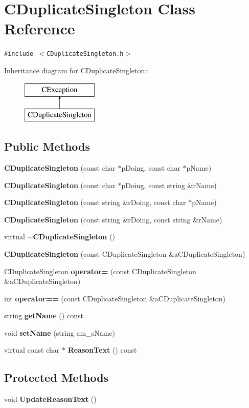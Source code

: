 \section{CDuplicate\-Singleton  Class Reference}
\label{classCDuplicateSingleton}
{\tt \#include $<$CDuplicate\-Singleton.h$>$}

Inheritance diagram for CDuplicate\-Singleton::\begin{figure}[H]
\begin{center}
\leavevmode
\includegraphics[height=2cm]{classCDuplicateSingleton}
\end{center}
\end{figure}
\subsection*{Public Methods}
\begin{CompactItemize}
\item 
{\bf CDuplicate\-Singleton} (const char $\ast$p\-Doing, const char $\ast$p\-Name)
\item 
{\bf CDuplicate\-Singleton} (const char $\ast$p\-Doing, const string \&r\-Name)
\item 
{\bf CDuplicate\-Singleton} (const string \&r\-Doing, const char $\ast$p\-Name)
\item 
{\bf CDuplicate\-Singleton} (const string \&r\-Doing, const string \&r\-Name)
\item 
virtual {\bf $\sim$CDuplicate\-Singleton} ()
\item 
{\bf CDuplicate\-Singleton} (const CDuplicate\-Singleton \&a\-CDuplicate\-Singleton)
\item 
CDuplicate\-Singleton {\bf operator=} (const CDuplicate\-Singleton \&a\-CDuplicate\-Singleton)
\item 
int {\bf operator==} (const CDuplicate\-Singleton \&a\-CDuplicate\-Singleton)
\item 
string {\bf get\-Name} () const
\item 
void {\bf set\-Name} (string am\_\-s\-Name)
\item 
virtual const char $\ast$ {\bf Reason\-Text} () const
\end{CompactItemize}
\subsection*{Protected Methods}
\begin{CompactItemize}
\item 
void {\bf Update\-Reason\-Text} ()
\end{CompactItemize}
